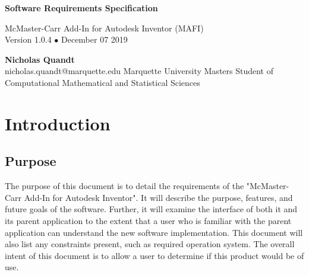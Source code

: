 \documentclass[12pt, letterpaper]{article}
\begin{document}
\begin{titlepage}
   \begin{flushright}
       \vspace*{5cm}
 
       {\Huge \textbf{Software Requirements Specification}}
 
       \vspace{0.5cm}
        McMaster-Carr Add-In for Autodesk Inventor (MAFI)\\
        Version 1.0.4 $\bullet$ December 07 2019
 
       \vspace{1.5cm}
 
       \textbf{Nicholas Quandt}
       \\
       nicholas.quandt@marquette.edu
       \vfill
       Marquette University Masters Student of\\
       Computational Mathematical and Statistical Sciences\\
       \vspace{1cm}
 
   \end{flushright}
\end{titlepage}


\tableofcontents
\newpage

\section{Introduction}
\subsection{Purpose}
The purpose of this document is to detail the requirements of the "McMaster-Carr Add-In for Autodesk Inventor". It will describe the purpose, features, and future goals of the software. Further, it will examine the interface of both it and its parent application to the extent that a user who is familiar with the parent application can understand the new software implementation. This document will also list any constraints present, such as required operation system. The overall intent of this document is to allow a user to determine if this product would be of use.
\end{document}
